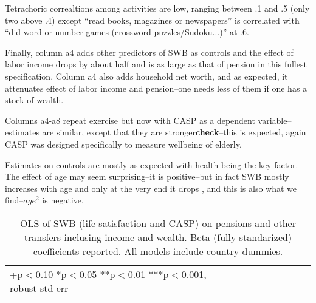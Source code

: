 \documentclass[10pt, letterpaper]{article}
\begin{document}
\begin{spacing}{1.4}
Tetrachoric correaltions among activities are low, ranging between .1 and .5
(only two above .4) except ``read books, magazines or newspapers'' is
correlated with ``did word or number games (crossword puzzles/Sudoku...)'' at .6.

Finally, column a4 adds other predictors of SWB as controls and the effect of labor income drops by
about half
and is as large as that of pension in this fullest specification. Column a4 also adds household net
worth, and as expected, it attenuates effect of labor income and pension--one
needs less of them if one has a stock of wealth. 
%

Columns a4-a8 repeat exercise but now with CASP as a dependent
variable--estimates are similar, except that they are
stronger\textbf{check}--this is expected, again CASP was designed specifically
to measure wellbeing of elderly. 

%


Estimates on controls are mostly as expected with health being the key
factor. The effect of age may seem surprising--it is  positive--but in fact SWB mostly
increases with age and only at the very end it drops \citep{gwozdz10}, and this
is also what we find--$age^2$ is negative.


\begin{spacing}{.9}
\begin{table}[H]\centering \caption{OLS of SWB (life satisfaction and CASP) on pensions and
    other transfers inclusing income and wealth. Beta (fully standarized)
    coefficients reported. All models
    include country dummies.}  \begin{scriptsize} \begin{tabular}{p{1.8in}p{.5in}p{.5in}p{.5in}p{.5in}|p{.5in}p{.5in}p{.5in}p{.5in}p{.5in}p{.4in}p{.5in}p{.4in}}\hline 
      \hline\multicolumn{5}{l}{+p$<$0.10 *p$<$0.05 **p$<$0.01 ***p$<$0.001,
        robust std err} \end{tabular}\label{regA} \end{scriptsize}\end{table}
\end{spacing}



\end{spacing}
\end{document}
